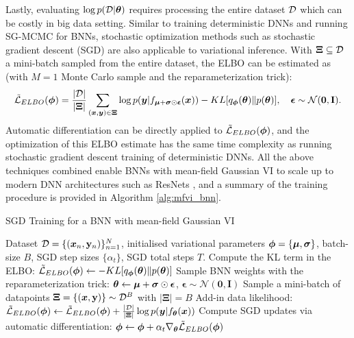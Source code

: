 Lastly, evaluating $\log p(\mathcal{D}|\bm{\theta})$ requires processing the entire dataset $\mathcal{D}$ which can be costly in big data setting. Similar to training deterministic DNNs and running SG-MCMC for BNNs, stochastic optimization methods such as stochastic gradient descent (SGD) \citep{bottou:ol1998} are also applicable to variational inference. With $\bm{\Xi}\subseteq\mathcal{D}$ a mini-batch sampled from the entire dataset, the ELBO can be estimated as (with $M=1$ Monte Carlo sample and the reparameterization trick):
%
\begin{equation}
    \tilde{\mathcal{L}}_{ELBO}(\bm{\phi}) = \frac{|\mathcal{D}|}{|\bm{\Xi}|} \sum_{(\bm{x}, \bm{y}) \in \bm{\Xi}} \log p(\bm{y}| f_{\bm{\mu} + \bm{\sigma} \odot \bm{\epsilon}}(\bm{x})) - KL[q_{\bm{\phi}}(\bm{\theta})\|p(\bm{\theta})], \quad \bm{\epsilon} \sim \mathcal{N}(\bm{0}, \mathbf{I}).
\label{eq:elbo_mc_estimate_minibatch}
\end{equation}
Automatic differentiation can be directly applied to $\tilde{\mathcal{L}}_{ELBO}(\bm{\phi})$, and the optimization of this ELBO estimate has the same time complexity as running stochastic gradient descent training of deterministic DNNs. All the above techniques combined enable BNNs with mean-field Gaussian VI to scale up to modern DNN architectures such as ResNets \citep{he:resnet2016}, and a summary of the training procedure is provided in Algorithm \ref{alg:mfvi_bnn}.


\begin{algorithm}[t]
\caption{SGD Training for a BNN with mean-field Gaussian VI}\label{alg:mfvi_bnn}
\begin{algorithmic}[1]
\Require Dataset $\mathcal{D} = \{ (\bm{x}_n, \mathbf{y}_n) \}_{n=1}^N$, initialised variational parameters $\bm{\phi} = \{ \bm{\mu}, \bm{\sigma
} \}$,  batch-size $B$, SGD step sizes $\{\alpha_t \}$, SGD total steps $T$.
\State Compute the KL term in the ELBO:
$\tilde{\mathcal{L}}_{ELBO}(\bm{\phi}) \gets - KL[q_{\bm{\phi}}(\bm{\theta})\|p(\bm{\theta})]$ 
\State Sample BNN weights with the reparameterization trick: $\bm{\theta} \gets \bm{\mu} + \bm{\sigma} \odot \bm{\epsilon}$, $\bm{\epsilon} \sim \mathcal{N}(\bm{0}, \mathbf{I})$
\State Sample a mini-batch of datapoints $\bm{\Xi} = \{ (\bm{x}, \mathbf{y}) \} \sim \mathcal{D}^B$ with $| \bm{\Xi} | = B$
\For{$(\x, \y) \in \bm{\Xi}$}
    \State Add-in data likelihood: $\tilde{\mathcal{L}}_{ELBO}(\bm{\phi}) \gets \tilde{\mathcal{L}}_{ELBO}(\bm{\phi}) + \frac{|\mathcal{D}|}{|\bm{\Xi}|} \log p(\bm{y}| f_{\bm{\theta}}(\bm{x}))$
\EndFor
\State Compute SGD updates via automatic differentiation:
$\bm{\phi} \gets \bm{\phi} + \alpha_t \nabla_{\bm{\theta}} \tilde{\mathcal{L}}_{ELBO}(\bm{\phi})$
\EndFor
\end{algorithmic}
\end{algorithm}



